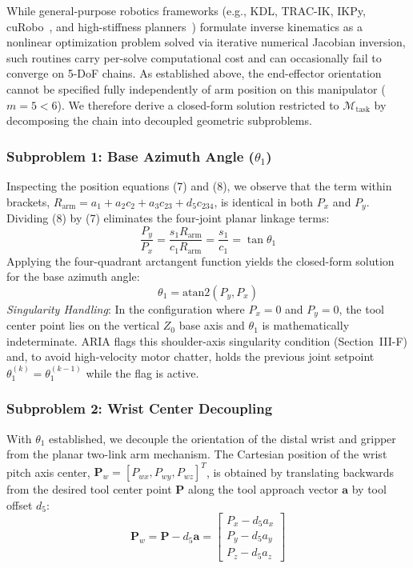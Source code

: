 \documentclass[journal]{IEEEtran}
\begin{document}
While general-purpose robotics frameworks (e.g., KDL, TRAC-IK, IKPy, cuRobo~\cite{aria_050_sundaralingam_2024_curobo}, and high-stiffness planners~\cite{aria_044_pang_2025_highstiffness}) formulate inverse kinematics as a nonlinear optimization problem solved via iterative numerical Jacobian inversion, such routines carry per-solve computational cost and can occasionally fail to converge on 5-DoF chains. As established above, the end-effector orientation cannot be specified fully independently of arm position on this manipulator ($m=5<6$). We therefore derive a closed-form solution restricted to $\mathcal{M}_{\text{task}}$ by decomposing the chain into decoupled geometric subproblems.

\subsubsection{Subproblem 1: Base Azimuth Angle ($\theta_1$)}
Inspecting the position equations (7) and (8), we observe that the term within brackets, $R_{\text{arm}} = a_1 + a_2 c_2 + a_3 c_{23} + d_5 c_{234}$, is identical in both $P_x$ and $P_y$. Dividing (8) by (7) eliminates the four-joint planar linkage terms:
\begin{equation}
\frac{P_y}{P_x} = \frac{s_1 R_{\text{arm}}}{c_1 R_{\text{arm}}} = \frac{s_1}{c_1} = \tan\theta_1
\end{equation}
Applying the four-quadrant arctangent function yields the closed-form solution for the base azimuth angle:
\begin{equation}
\theta_1 = \text{atan2}(P_y, P_x)
\end{equation}
\textit{Singularity Handling}: In the configuration where $P_x = 0$ and $P_y = 0$, the tool center point lies on the vertical $Z_0$ base axis and $\theta_1$ is mathematically indeterminate. ARIA flags this shoulder-axis singularity condition (Section~III-F) and, to avoid high-velocity motor chatter, holds the previous joint setpoint $\theta_1^{(k)} = \theta_1^{(k-1)}$ while the flag is active.

\subsubsection{Subproblem 2: Wrist Center Decoupling}
With $\theta_1$ established, we decouple the orientation of the distal wrist and gripper from the planar two-link arm mechanism. The Cartesian position of the wrist pitch axis center, $\mathbf{P}_w = [P_{wx}, P_{wy}, P_{wz}]^T$, is obtained by translating backwards from the desired tool center point $\mathbf{P}$ along the tool approach vector $\mathbf{a}$ by tool offset $d_5$:
\begin{equation}
\mathbf{P}_w = \mathbf{P} - d_5 \mathbf{a} = \begin{bmatrix}
P_x - d_5 a_x \\
P_y - d_5 a_y \\
P_z - d_5 a_z
\end{bmatrix}
\end{equation}
\end{document}
